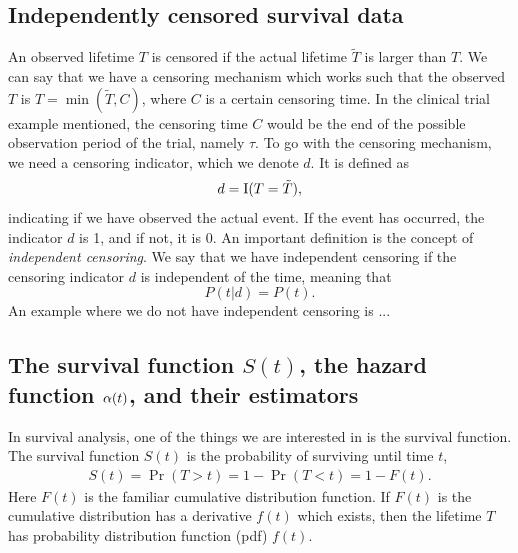 \subsection{Independently censored survival data}
An observed lifetime $T$ is censored if the actual lifetime $\tilde{T}$ is larger than $T$. We can say that we have a censoring mechanism which works such that the observed $T$ is $T=\min(\tilde{T}, C)$, where $C$ is a certain censoring time. In the clinical trial example mentioned, the censoring time $C$ would be the end of the possible observation period of the trial, namely $\tau$.
To go with the censoring mechanism, we need a censoring indicator, which we denote $d$. It is defined as
\begin{equation}\label{eq:censoring}
    d=\operatorname{I}(T=\tilde{T}),
\end{equation}
indicating if we have observed the actual event. If the event has occurred, the indicator $d$ is 1, and if not, it is 0. An important definition is the concept of \textit{independent censoring}. We say that we have independent censoring if the censoring indicator $d$ is independent of the time, meaning that
\begin{equation*}
    P(t|d)=P(t).
\end{equation*}
An example where we do not have independent censoring is ...

\subsection{The survival function $S(t)$, the hazard function $\alpha(t)$, and their estimators}
In survival analysis, one of the things we are interested in is the survival function. The survival function $S(t)$ is the probability of surviving until time $t$,
\begin{align*}
    S(t)=\Pr(T>t)=1-\Pr(T<t)=1-F(t).
\end{align*}
Here $F(t)$ is the familiar cumulative distribution function. If $F(t)$ is the cumulative distribution has a derivative $f(t)$ which exists, then the lifetime $T$ has probability distribution function (pdf) $f(t)$.

